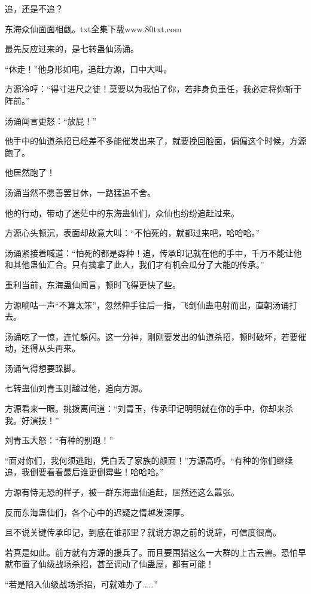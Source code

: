 
\begin{this_body}

追，还是不追？

东海众仙面面相觑。txt全集下载www.80txt.com

最先反应过来的，是七转蛊仙汤诵。

“休走！”他身形如电，追赶方源，口中大叫。

方源冷哼：“得寸进尺之徒！莫要以为我怕了你，若非身负重任，我必定将你斩于阵前。”

汤诵闻言更怒：“放屁！”

他手中的仙道杀招已经差不多能催发出来了，就要挽回脸面，偏偏这个时候，方源跑了。

他居然跑了！

汤诵当然不愿善罢甘休，一路猛追不舍。

他的行动，带动了迷茫中的东海蛊仙们，众仙也纷纷追赶过来。

方源心头顿沉，表面却故意大叫：“不怕死的，就都过来吧，哈哈哈。”

汤诵紧接着喊道：“怕死的都是孬种！追，传承印记就在他的手中，千万不能让他和其他蛊仙汇合。只有擒拿了此人，我们才有机会瓜分了大能的传承。”

重利当前，东海蛊仙闻言，顿时飞得更快了些。

方源嘀咕一声“不算太笨”，忽然伸手往后一指，飞剑仙蛊电射而出，直朝汤诵打去。

汤诵吃了一惊，连忙躲闪。这一分神，刚刚要发出的仙道杀招，顿时破坏，若要催动，还得从头再来。

汤诵气得想要跺脚。

七转蛊仙刘青玉则越过他，追向方源。

方源看来一眼。挑拨离间道：“刘青玉，传承印记明明就在你的手中，你却来杀我。好演技！”

刘青玉大怒：“有种的别跑！”

“面对你们，我何须逃跑，凭白丢了家族的颜面！”方源高呼。“有种的你们继续追，我倒要看看最后谁更倒霉些！哈哈哈。”

方源有恃无恐的样子，被一群东海蛊仙追赶，居然还这么嚣张。

反而东海蛊仙们，各个心中的迟疑之情越发深厚。

且不说关键传承印记，到底在谁那里？就说方源之前的说辞，可信度很高。

若真是如此。前方就有方源的援兵了。而且要围猎这么一大群的上古云兽。恐怕早就布置了仙级战场杀招，甚至调动了仙蛊屋，都有可能！

“若是陷入仙级战场杀招，可就难办了……”


\end{this_body}
